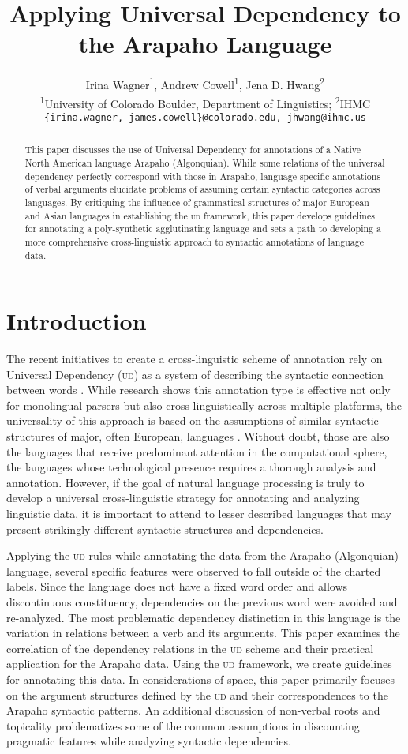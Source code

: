 \documentclass[11pt]{article}
\title{Applying Universal Dependency to the Arapaho Language}
\author{Irina Wagner\textsuperscript{1}, Andrew Cowell\textsuperscript{1}, Jena D. Hwang\textsuperscript{2} \\
\textsuperscript{1}University of Colorado Boulder,
  Department of Linguistics; \textsuperscript{2}IHMC\\
  {\tt \{irina.wagner, james.cowell\}@colorado.edu,  jhwang@ihmc.us}}
\date{}
\begin{document}
\maketitle
\begin{abstract}

  This paper discusses the use of Universal Dependency for annotations of a Native North American language Arapaho (Algonquian). While some relations of the universal dependency perfectly correspond with those in Arapaho, language specific annotations of verbal arguments elucidate problems of assuming certain syntactic categories across languages. By critiquing the influence of grammatical structures of major European and Asian languages in establishing the \textsc{ud} framework, this paper develops guidelines for annotating a poly-synthetic agglutinating language and sets a path to developing a more comprehensive cross-linguistic approach to syntactic annotations of language data. 
 \end{abstract}

\section{Introduction}
	The recent initiatives to create a cross-linguistic scheme of annotation rely on Universal Dependency (\textsc{ud}) as a system of describing the syntactic connection between words \cite{Nivre2015,Marneffe2014}. While research shows this annotation type is effective not only for monolingual parsers but also cross-linguistically across multiple platforms, the universality of this approach is based on the assumptions of similar syntactic structures of major, often European, languages \cite{McDonald2013}. Without doubt, those are also the languages that receive predominant attention in the computational sphere, the languages whose technological presence requires a thorough analysis and annotation. However, if the goal of natural language processing is truly to develop a universal cross-linguistic strategy for annotating and analyzing linguistic data, it is important to attend to lesser described languages that may present strikingly different syntactic structures and dependencies. 

	Applying the \textsc{ud} rules while annotating the data from the Arapaho (Algonquian) language, several specific features were observed to fall outside of the charted labels. Since the language does not have a fixed word order and allows discontinuous constituency, dependencies on the previous word were avoided and re-analyzed. The most problematic dependency distinction in this language is the variation in relations between a verb and its arguments. This paper examines the correlation of the dependency relations in the \textsc{ud} scheme and their practical application for the Arapaho data. Using the \textsc{ud} framework, we create guidelines for annotating this data. In considerations of space, this paper primarily focuses on the argument structures defined by the \textsc{ud} and their correspondences to the Arapaho syntactic patterns. An additional discussion of non-verbal roots and topicality problematizes some of the common assumptions in discounting pragmatic features while analyzing syntactic dependencies. 
    
\end{document}
